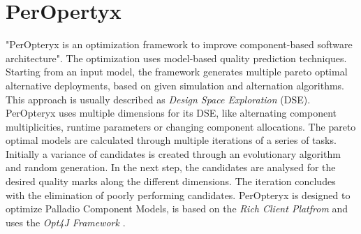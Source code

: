 \section{PerOpertyx}
\label{sec:Foundations:peropteryx}

"PerOpteryx is an optimization framework to improve component-based software architecture"\cite{PerOpteryx.b}. The optimization uses model-based quality prediction techniques. Starting from an input model, the framework generates multiple pareto optimal alternative deployments, based on given simulation and alternation algorithms. This approach is usually described as \textit{Design Space Exploration} (DSE). PerOpteryx uses multiple dimensions for its DSE, like alternating component multiplicities, runtime parameters or changing component allocations. The pareto optimal models are calculated through multiple iterations of a series of tasks. Initially a variance of candidates is created through an evolutionary algorithm and random generation. In the next step, the candidates are analysed for the desired quality marks along the different dimensions. The iteration concludes with the elimination of poorly performing candidates. PerOpteryx is designed to optimize Palladio Component Models, is based on the \textit{Rich Client Platfrom} and uses the \textit{Opt4J Framework} \cite{Martens.2010}.


